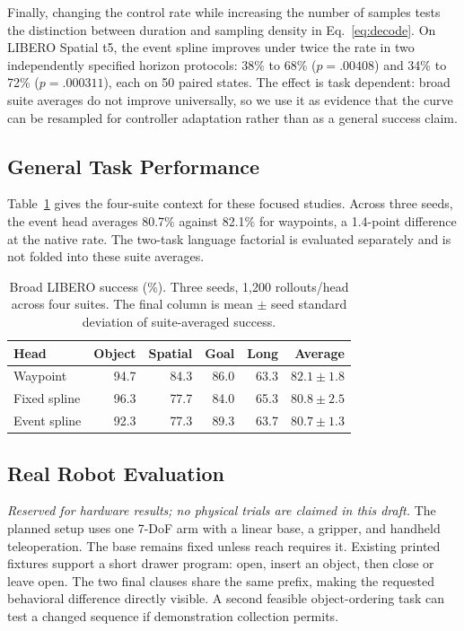 Finally, changing the control rate while increasing the number of samples tests the distinction between duration and sampling density in Eq.~\ref{eq:decode}. On LIBERO Spatial t5, the event spline improves under twice the rate in two independently specified horizon protocols: 38\% to 68\% ($p=.00408$) and 34\% to 72\% ($p=.000311$), each on 50 paired states. The effect is task dependent: broad suite averages do not improve universally, so we use it as evidence that the curve can be resampled for controller adaptation rather than as a general success claim.

\subsection{General Task Performance}

Table~\ref{tab:libero} gives the four-suite context for these focused studies. Across three seeds, the event head averages 80.7\% against 82.1\% for waypoints, a 1.4-point difference at the native rate. The two-task language factorial is evaluated separately and is not folded into these suite averages.

\begin{table}[t]
\centering
\caption{Broad LIBERO success (\%). Three seeds, 1,200 rollouts/head across four suites. The final column is mean $\pm$ seed standard deviation of suite-averaged success.}
\label{tab:libero}
\setlength{\tabcolsep}{3pt}
\begin{tabular}{lrrrrr}
\toprule
Head & Object & Spatial & Goal & Long & Average \\
\midrule
Waypoint & 94.7 & 84.3 & 86.0 & 63.3 & $82.1\pm1.8$ \\
Fixed spline & 96.3 & 77.7 & 84.0 & 65.3 & $80.8\pm2.5$ \\
Event spline & 92.3 & 77.3 & 89.3 & 63.7 & $80.7\pm1.3$ \\
\bottomrule
\end{tabular}
\end{table}

\subsection{Real Robot Evaluation}
\label{sec:hardware}

\textit{Reserved for hardware results; no physical trials are claimed in this draft.} The planned setup uses one 7-DoF arm with a linear base, a gripper, and handheld teleoperation. The base remains fixed unless reach requires it. Existing printed fixtures support a short drawer program: open, insert an object, then close or leave open. The two final clauses share the same prefix, making the requested behavioral difference directly visible. A second feasible object-ordering task can test a changed sequence if demonstration collection permits.

